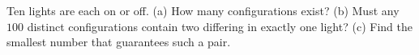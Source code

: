 Ten lights are each on or off. (a) How many configurations exist? (b) Must any $100$ distinct configurations contain two differing in exactly one light? (c) Find the smallest number that guarantees such a pair.
